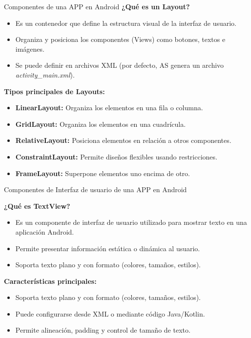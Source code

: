 \documentclass[aspectratio=169,compress]{beamer}
\begin{document}
\begin{frame}{Componentes de una APP en Android}
\textbf{¿Qué es un Layout?}
\begin{itemize} 
\item Es un contenedor que define la estructura visual de la interfaz de usuario. 
\item Organiza y posiciona los componentes (Views) como botones, textos e imágenes. 
\item Se puede definir en archivos XML (por defecto, AS genera un archivo \textit{activity\_main.xml}). 
\end{itemize}

\vspace{0.5cm} 
\textbf{Tipos principales de Layouts:} 
\begin{itemize} 
\item \textbf{LinearLayout:} Organiza los elementos en una fila o columna. 
\item \textbf{GridLayout:} Organiza los elementos en una cuadrícula. 
\item \textbf{RelativeLayout:} Posiciona elementos en relación a otros componentes. 
\item \textbf{ConstraintLayout:} Permite diseños flexibles usando restricciones. 
\item \textbf{FrameLayout:} Superpone elementos uno encima de otro. 
\end{itemize}
\end{frame}





\begin{frame}{Componentes de Interfaz de usuario de una APP en Android}


\textbf{¿Qué es TextView?} 
\begin{itemize} 
\item Es un componente de interfaz de usuario utilizado para mostrar texto en una aplicación Android. 
\item Permite presentar información estática o dinámica al usuario. 
\item Soporta texto plano y con formato (colores, tamaños, estilos).
\end{itemize} 

\textbf{Características principales:} 
\begin{itemize} 
\item Soporta texto plano y con formato (colores, tamaños, estilos). 
\item Puede configurarse desde XML o mediante código Java/Kotlin. 
\item Permite alineación, padding y control de tamaño de texto. 
\end{itemize}

\end{frame}
\end{document}
